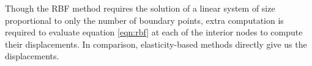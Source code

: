 Though the RBF method requires the solution of a linear system of size proportional to only the number of boundary points, extra computation is required to evaluate equation \eqref{eqn:rbf} at each of the interior nodes to compute their displacements. In comparison, elasticity-based methods directly give us the displacements.


